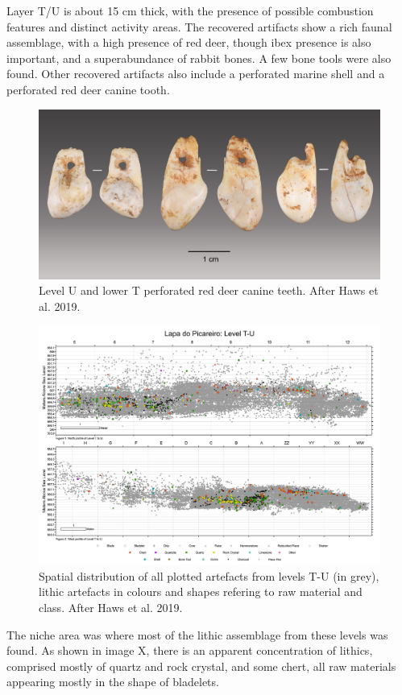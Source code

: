 \documentclass[12pt,twoside]{reedthesis}
\begin{document}
Layer T/U is about 15 cm thick, with the presence of possible combustion features and distinct activity areas. The recovered artifacts show a rich faunal assemblage, with a high presence of red deer, though ibex presence is also important, and a superabundance of rabbit bones. A few bone tools were also found. Other recovered artifacts also include a perforated marine shell and a perforated red deer canine tooth.
\begin{figure}
\includegraphics[width=1\linewidth]{figure/LP_teeth} \caption{Level U and lower T perforated red deer canine teeth. After Haws et al. 2019.}\label{fig:unnamed-chunk-6}
\end{figure}
\begin{figure}
\includegraphics[width=1\linewidth]{figure/LPspatial} \caption{Spatial distribution of all plotted artefacts from levels T-U (in grey), lithic artefacts in colours and shapes refering to raw material and class. After Haws et al. 2019.}\label{fig:unnamed-chunk-7}
\end{figure}
The niche area was where most of the lithic assemblage from these levels was found. As shown in image X, there is an apparent concentration of lithics, comprised mostly of quartz and rock crystal, and some chert, all raw materials appearing mostly in the shape of bladelets.
\end{document}
